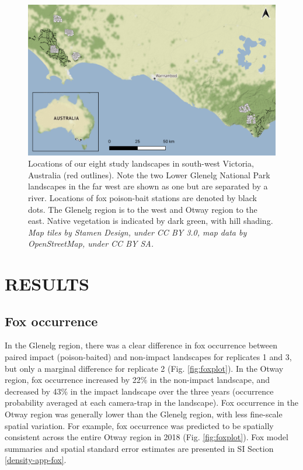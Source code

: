 \documentclass[]{elsarticle} %
\begin{document}
\begin{figure}

{\centering \includegraphics[width=1\linewidth]{figs/fig1} 

}

\caption{Locations of our eight study landscapes in south-west Victoria, Australia (red outlines). Note the two Lower Glenelg National Park landscapes in the far west are shown as one but are separated by a river. Locations of fox poison-bait stations are denoted by black dots. The Glenelg region is to the west and Otway region to the east. Native vegetation is indicated by dark green, with hill shading. \textit{Map tiles by Stamen Design, under CC BY 3.0, map data by OpenStreetMap, under CC BY SA.}}\label{fig:density-map}
\end{figure}

\newpage

\hypertarget{results}{%
\section{RESULTS}\label{results}}

\hypertarget{fox-occurrence}{%
\subsection{Fox occurrence}\label{fox-occurrence}}

In the Glenelg region, there was a clear difference in fox occurrence between paired impact (poison-baited) and non-impact landscapes for replicates 1 and 3, but only a marginal difference for replicate 2 (Fig. \ref{fig:foxplot}). In the Otway region, fox occurrence increased by 22\% in the non-impact landscape, and decreased by 43\% in the impact landscape over the three years (occurrence probability averaged at each camera-trap in the landscape). Fox occurrence in the Otway region was generally lower than the Glenelg region, with less fine-scale spatial variation. For example, fox occurrence was predicted to be spatially consistent across the entire Otway region in 2018 (Fig. \ref{fig:foxplot}). Fox model summaries and spatial standard error estimates are presented in SI Section \ref{density-app-fox}.
\end{document}
